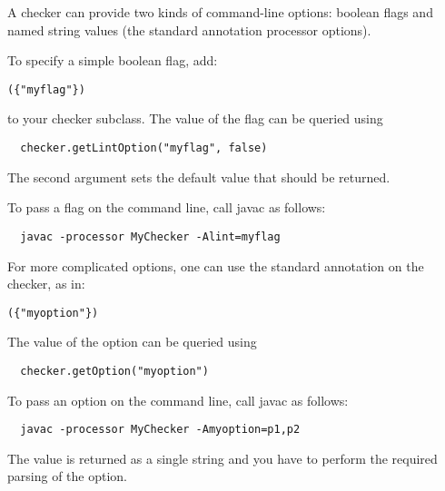 
A checker can provide two kinds of command-line options:
boolean flags and
named string values (the standard annotation processor
options).


To specify a simple boolean flag, add:

\begin{alltt}
  (\{"myflag"\})
\end{alltt}

\noindent
to your checker subclass.
The value of the flag can be queried using

\begin{Verbatim}
  checker.getLintOption("myflag", false)
\end{Verbatim}

The second argument sets the default value that should be returned.

To pass a flag on the command line, call javac as follows:

\begin{Verbatim}
  javac -processor MyChecker -Alint=myflag
\end{Verbatim}



For more complicated options, one can use the standard
 annotation on the checker, as in:

\begin{alltt}
  (\{"myoption"\})
\end{alltt}

The value of the option can be queried using

\begin{Verbatim}
  checker.getOption("myoption")
\end{Verbatim}

To pass an option on the command line, call javac as follows:

\begin{Verbatim}
  javac -processor MyChecker -Amyoption=p1,p2
\end{Verbatim}

The value is returned as a single string and you have to perform the
required parsing of the option.


